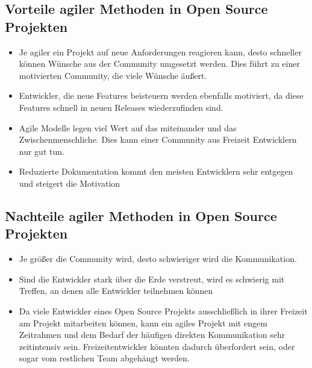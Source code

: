 \subsection{Vorteile agiler Methoden in Open Source Projekten}

\begin{itemize}
	\item Je agiler ein Projekt auf neue Anforderungen reagieren kann, desto schneller können Wünsche aus der Community umgesetzt werden. Dies führt zu einer motivierten Community, die viele Wünsche äußert.
	\item Entwickler, die neue Features beisteuern werden ebenfalls motiviert, da diese Features schnell in neuen Releases wiederzufinden sind.
	\item Agile Modelle legen viel Wert auf das miteinander und das Zwischenmenschliche. Dies kann einer Community aus Freizeit Entwicklern nur gut tun.
	\item Reduzierte Dokumentation kommt den meisten Entwicklern sehr entgegen und steigert die Motivation
\end{itemize}


 
  
\subsection{Nachteile agiler Methoden in Open Source Projekten}
\begin{itemize}
	\item Je größer die Community wird, desto schwieriger wird die Kommunikation.
	\item Sind die Entwickler stark über die Erde verstreut, wird es schwierig mit Treffen, an denen alle Entwickler teilnehmen können
	\item Da viele Entwickler eines Open Source Projekts ausschließlich in ihrer Freizeit am Projekt mitarbeiten können, kann ein agiles Projekt mit engem Zeitrahmen und dem Bedarf der häufigen direkten Kommunikation sehr zeitintensiv sein. Freizeitentwickler könnten dadurch überfordert sein, oder sogar vom restlichen Team abgehängt werden.
\end{itemize}

